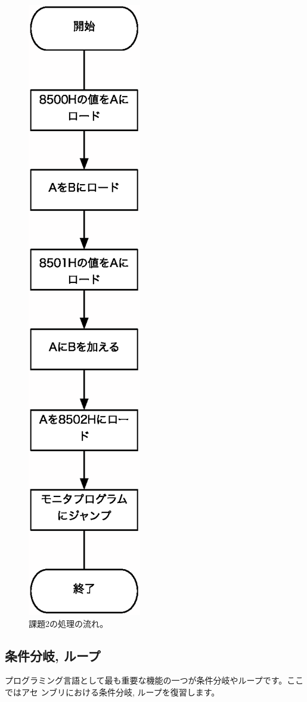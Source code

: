 \begin{description}
\begin{figure}[htbp]
\begin{center}
\includegraphics[height=0.6\linewidth]{img/flow1.eps}
\caption{課題2の処理の流れ。}
\label{fig:flow1}
\end{center}
\end{figure}
\end{description}

\subsection{条件分岐, ループ}

プログラミング言語として最も重要な機能の一つが条件分岐やループです。ここではアセ
ンブリにおける条件分岐, ループを復習します。

